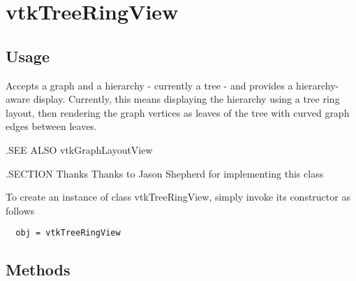 \section{vtkTreeRingView}

\subsection{Usage}

 Accepts a graph and a hierarchy - currently
 a tree - and provides a hierarchy-aware display.  Currently, this means
 displaying the hierarchy using a tree ring layout, then rendering the graph
 vertices as leaves of the tree with curved graph edges between leaves.

 .SEE ALSO
 vtkGraphLayoutView

 .SECTION Thanks
 Thanks to Jason Shepherd for implementing this class

To create an instance of class vtkTreeRingView, simply
invoke its constructor as follows
\begin{verbatim}
  obj = vtkTreeRingView
\end{verbatim}
\subsection{Methods}

